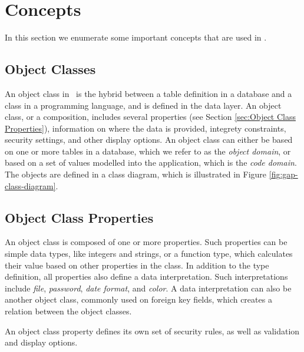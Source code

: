 \section{Concepts}
\label{sec:Concepts}
In this section we enumerate some important concepts that are used in \gap.

\subsection{Object Classes}
\label{sub:Object Classes}
An object class in \gap~is the hybrid between a table definition in a database and a class in a programming language, and is defined in the data layer. An object class, or a composition, includes several properties (see Section \ref{sec:Object Class Properties}), information on where the data is provided, integrety constraints, security settings, and other display options. An object class can either be based on one or more tables in a database, which we refer to as the \textit{object domain}, or based on a set of values modelled into the application, which is the \textit{code domain}. The objects are defined in a class diagram, which is illustrated in Figure \ref{fig:gap-class-diagram}.

\subsection{Object Class Properties}
\label{sub:Object Class Properties}
An object class is composed of one or more properties. Such properties can be simple data types, like integers and strings, or a function type, which calculates their value based on other properties in the class. In addition to the type definition, all properties also define a data interpretation. Such interpretations include \textit{file}, \textit{password}, \textit{date format}, and \textit{color}. A data interpretation can also be another object class, commonly used on foreign key fields, which creates a relation between the object classes.

An object class property defines its own set of security rules, as well as validation and display options.

